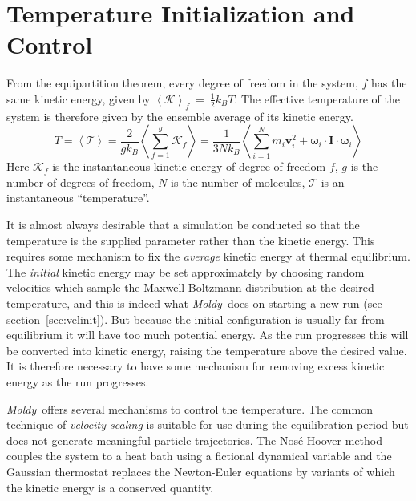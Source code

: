 \documentclass[a4paper,twoside]{report}
\newcommand{\bm}[1]{\mathbf{#1}}
\newcommand{\moldy}{\emph{Moldy}}
\begin{document}
\section{Temperature Initialization and Control}%
From the equipartition theorem, every degree of freedom in the system,
$f$ has the same kinetic energy, given by $\left < {\mathcal K} \right
>_f~=~\frac{1}{2}k_BT$.  The effective temperature of the system is
therefore given by the ensemble average of its kinetic energy.
\begin{equation}
\label{eqn:equipartition}
T = \left < {\mathcal T} \right > = \frac{2}{gk_B} \left <
  \sum_{f=1}^{g} {\mathcal K}_f \right > = \frac{1}{3Nk_B}\left <
  \sum_{i=1}^N m_i \bm{v}_i^2 + \bm\omega_i \cdot \bm{I} \cdot
  \bm\omega_i \right >
\end{equation}
Here ${\mathcal K}_f$ is the instantaneous kinetic energy of degree of
freedom $f$, $g$ is the number of degrees of freedom, $N$ is the
number of molecules, $\mathcal T$ is an instantaneous ``temperature''.

It is almost always desirable that a simulation be conducted so that
the temperature is the supplied parameter rather than the kinetic
energy.  This requires some mechanism to fix the \emph{average}
kinetic energy at thermal equilibrium.  The \emph{initial} kinetic
energy may be set approximately by choosing random velocities which
sample the Maxwell-Boltzmann distribution at the desired temperature,
and this is indeed what \moldy\ does on starting a new run (see
section~\ref{sec:velinit}).  But because the initial configuration is
usually far from equilibrium it will have too much potential energy.
As the run progresses this will be converted into kinetic energy,
raising the temperature above the desired value. It is therefore
necessary to have some mechanism for removing excess kinetic energy as
the run progresses.

\moldy\ offers several mechanisms to control the temperature. The
common technique of \emph{velocity scaling} is suitable for use
during the equilibration period but does not generate meaningful
particle trajectories. The Nos\'e-Hoover method couples the system to
a heat bath using a fictional dynamical variable and the Gaussian
thermostat replaces the Newton-Euler equations by variants of which
the kinetic energy is a conserved quantity.
\end{document}
